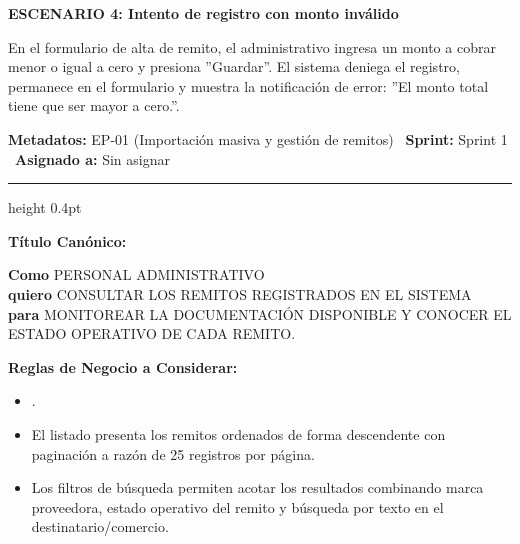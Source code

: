 \documentclass[a4paper,9pt]{article}
\begin{document}
\begin{tcolorbox}[hucard, title={\textbf{HU-4: AGREGAR UN REMITO} \hfill \scriptsize \colorbox{tealstatus}{\textbf{\ Accepted\ }} \quad \colorbox{white}{\textcolor{primarydark}{\textbf{\ 3 pts\ }}}}]
{\noindent\textbf{\textcolor{secondarydark}{ESCENARIO 4:  Intento de registro con monto inválido}}\par\vspace{1pt}
En el formulario de alta de remito, el administrativo ingresa un monto a cobrar menor o igual a cero y presiona ''Guardar''. El sistema deniega el registro, permanece en el formulario y muestra la notificación de error: ''El monto total tiene que ser mayor a cero.''.\par\vspace{2.5pt}
}\par
\end{tcolorbox}

\begin{tcolorbox}[hucard, title={\textbf{HU-5: CONSULTAR REMITOS REGISTRADOS} \hfill \scriptsize \colorbox{tealstatus}{\textbf{\ Accepted\ }} \quad \colorbox{white}{\textcolor{primarydark}{\textbf{\ 2 pts\ }}}}]
\vspace{-1pt}
\noindent\textbf{\footnotesize Metadatos:} EP-01 (Importación masiva y gestión de remitos) \textbar\ \textbf{Sprint:} Sprint 1 \textbar\ \textbf{Asignado a:} Sin asignar\par\vspace{2pt}
\hrule height 0.4pt\par\vspace{3pt}
\noindent\textbf{\footnotesize Título Canónico:}\par\vspace{1pt}
{\small \textbf{Como} PERSONAL ADMINISTRATIVO \\ \textbf{quiero} CONSULTAR LOS REMITOS REGISTRADOS EN EL SISTEMA \\ \textbf{para} MONITOREAR LA DOCUMENTACIÓN DISPONIBLE Y CONOCER EL ESTADO OPERATIVO DE CADA REMITO.}\par\vspace{3pt}
\noindent\textbf{\footnotesize Reglas de Negocio a Considerar:}\par\vspace{1pt}
{\footnotesize
\begin{itemize}[leftmargin=12pt, nosep, itemsep=1.5pt, topsep=1pt]
\item .
\item El listado presenta los remitos ordenados de forma descendente con paginación a razón de 25 registros por página.
\item Los filtros de búsqueda permiten acotar los resultados combinando marca proveedora, estado operativo del remito y búsqueda por texto en el destinatario/comercio.

\end{itemize}}
\end{tcolorbox}
\end{document}
